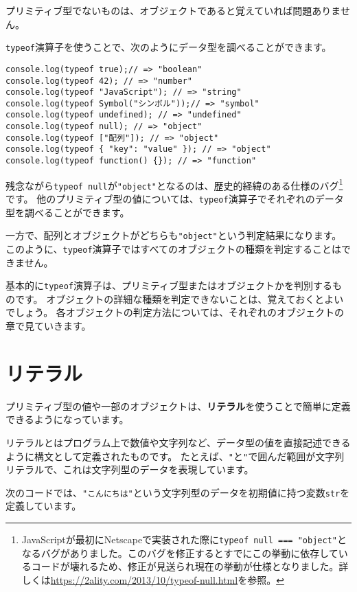 プリミティブ型でないものは、オブジェクトであると覚えていれば問題ありません。

\texttt{typeof}演算子を使うことで、次のようにデータ型を調べることができます。

\begin{lstlisting}
console.log(typeof true);// => "boolean"
console.log(typeof 42); // => "number"
console.log(typeof "JavaScript"); // => "string"
console.log(typeof Symbol("シンボル"));// => "symbol"
console.log(typeof undefined); // => "undefined"
console.log(typeof null); // => "object"
console.log(typeof ["配列"]); // => "object"
console.log(typeof { "key": "value" }); // => "object"
console.log(typeof function() {}); // => "function"
\end{lstlisting}

残念ながら\texttt{typeof null}が\texttt{"object"}となるのは、歴史的経緯のある仕様のバグ\footnote{JavaScriptが最初にNetscapeで実装された際に\texttt{typeof null === "object"}となるバグがありました。このバグを修正するとすでにこの挙動に依存しているコードが壊れるため、修正が見送られ現在の挙動が仕様となりました。詳しくは\url{https://2ality.com/2013/10/typeof-null.html}を参照。}です。
他のプリミティブ型の値については、\texttt{typeof}演算子でそれぞれのデータ型を調べることができます。

一方で、配列とオブジェクトがどちらも\texttt{"object"}という判定結果になります。
このように、\texttt{typeof}演算子ではすべてのオブジェクトの種類を判定することはできません。

基本的に\texttt{typeof}演算子は、プリミティブ型またはオブジェクトかを判別するものです。
オブジェクトの詳細な種類を判定できないことは、覚えておくとよいでしょう。
各オブジェクトの判定方法については、それぞれのオブジェクトの章で見ていきます。

\hypertarget{literal}{%
\section{リテラル}\label{literal}}

プリミティブ型の値や一部のオブジェクトは、\textbf{リテラル}を使うことで簡単に定義できるようになっています。

リテラルとはプログラム上で数値や文字列など、データ型の値を直接記述できるように構文として定義されたものです。
たとえば、\texttt{"}と\texttt{"}で囲んだ範囲が文字列リテラルで、これは文字列型のデータを表現しています。

次のコードでは、\texttt{"こんにちは"}という文字列型のデータを初期値に持つ変数\texttt{str}を定義しています。

